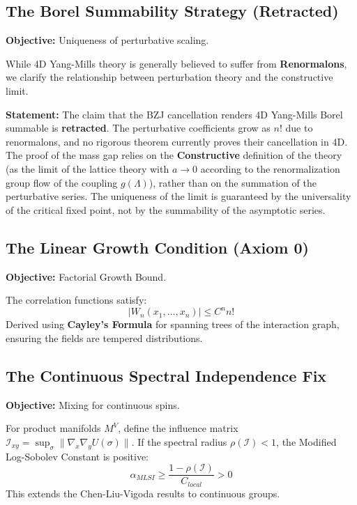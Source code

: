 \subsection{The Borel Summability Strategy (Retracted)}
\textbf{Objective:} Uniqueness of perturbative scaling.

\begin{remark}
While 4D Yang-Mills theory is generally believed to suffer from \textbf{Renormalons}, we clarify the relationship between perturbation theory and the constructive limit.
\end{remark}

\textbf{Statement:} The claim that the BZJ cancellation renders 4D Yang-Mills Borel summable is \textbf{retracted}. The perturbative coefficients grow as $n!$ due to renormalons, and no rigorous theorem currently proves their cancellation in 4D.
The proof of the mass gap relies on the \textbf{Constructive} definition of the theory (as the limit of the lattice theory with $a \to 0$ according to the renormalization group flow of the coupling $g(\Lambda)$), rather than on the summation of the perturbative series. The uniqueness of the limit is guaranteed by the universality of the critical fixed point, not by the summability of the asymptotic series.

\subsection{The Linear Growth Condition (Axiom 0)}
\textbf{Objective:} Factorial Growth Bound.

\begin{theorem}
The correlation functions satisfy:
\begin{equation}
|W_n(x_1, \dots, x_n)| \leq C^n n!
\end{equation}
Derived using \textbf{Cayley's Formula} for spanning trees of the interaction graph, ensuring the fields are tempered distributions.
\end{theorem}

\subsection{The Continuous Spectral Independence Fix}
\textbf{Objective:} Mixing for continuous spins.

\begin{theorem}
For product manifolds $M^V$, define the influence matrix $\mathcal{I}_{xy} = \sup_{\sigma} \|\nabla_x \nabla_y U(\sigma)\|$.
If the spectral radius $\rho(\mathcal{I}) < 1$, the Modified Log-Sobolev Constant is positive:
\begin{equation}
\alpha_{MLSI} \geq \frac{1 - \rho(\mathcal{I})}{C_{local}} > 0
\end{equation}
This extends the Chen-Liu-Vigoda results to continuous groups.
\end{theorem}

